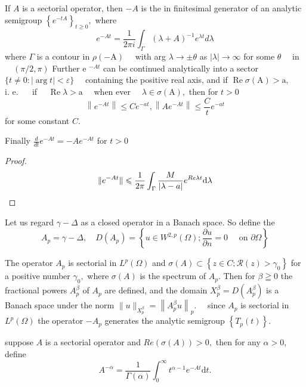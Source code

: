 \begin{theorem}
	If $A$ is a sectorial operator, then $-A$ is the in finitesimal generator of an analytic semigroup $\left\{e^{-t A}\right\}_{t \geq 0},$ where
	$$
	e^{-A t}=\frac{1}{2 \pi i} \int_{\Gamma}(\lambda+A)^{-1} e^{\lambda t} d \lambda
	$$
	where $\Gamma$ is a contour in $\rho(-\mathrm{A}) \quad$ with arg $\lambda \rightarrow \pm \theta$ as $|\lambda| \rightarrow \infty$ for
	some $\theta \quad$ in $\quad(\pi / 2, \pi)$
	Further e $^{-A t}$ can be continued analytically into a sector
	$\{t \neq 0:|\arg t|<\varepsilon\} \quad$ containing the positive real axis, and if
	$\operatorname{Re} \sigma(\mathrm{A})>\mathrm{a}, \quad$ i. e. $\quad$ if $\quad \operatorname{Re} \lambda>\mathrm{a} \quad$ when ever $\quad \lambda \in \sigma(\mathrm{A}),$ then for $t>0$
	$$
	\left\|e^{-A t}\right\| \leq C e^{-a t},\left\|A e^{-A t}\right\| \leq \frac{C}{t} e^{-a t}
	$$
	for some constant $C$.
	
	Finally $\frac{d}{d t} e^{-A t}=-A e^{-A t}$ for $t>0$
	\end{theorem}

\begin{proof}
\begin{equation}
	\|e^{-At}\| \leqslant \frac{1}{2\pi}\int_\Gamma\frac{M}{|\lambda - a|}e^{Re \lambda t}\mathrm{d}\lambda\\
\end{equation}
\end{proof}

Let us regard $\gamma-\Delta$ as a closed operator in a Banach space. So define the
$$
A_{p}=\gamma-\Delta, \quad D\left(A_{p}\right)=\left\{u \in W^{2, p}(\Omega) ; \frac{\partial u}{\partial n}=0 \quad \text { on } \partial \Omega\right\}
$$

The operator $A_{p}$ is sectorial in $L^{p}(\Omega)$ and $\sigma(A) \subset\left\{z \in C ; \mathscr{R}(z)>\gamma_{0}\right\}$ for a positive number $\gamma_{0},$ where $\sigma(A)$ is the spectrum of $A_{p} .$ Then for $\beta \geqq 0$ the fractional powers $A_{p}^{\beta}$ of $A_{p}$ are defined, and the domain $X_{p}^{\beta}=D\left(A_{p}^{\beta}\right)$ is a Banach space under the norm $\|u\|_{X_{p}^{\beta}}=\left\|A_{p}^{\beta} u\right\|_{p} . \quad$ since $A_{p}$ is sectorial in $L^{p}(\Omega)$ the operator $-A_{p}$ generates the analytic semigroup $\left\{T_{p}(t)\right\} .$ 

\begin{definition}
	suppose $A$ is a sectorial operator and $Re(\sigma(A))>0,$ then for any $\alpha>0$, define 
	\begin{equation}
		A^{-\alpha} = \frac{1}{\Gamma(\alpha)}\int_0^{\infty}t^{\alpha-1}e^{-At}\mathrm{d}t.
	\end{equation}
\end{definition}

